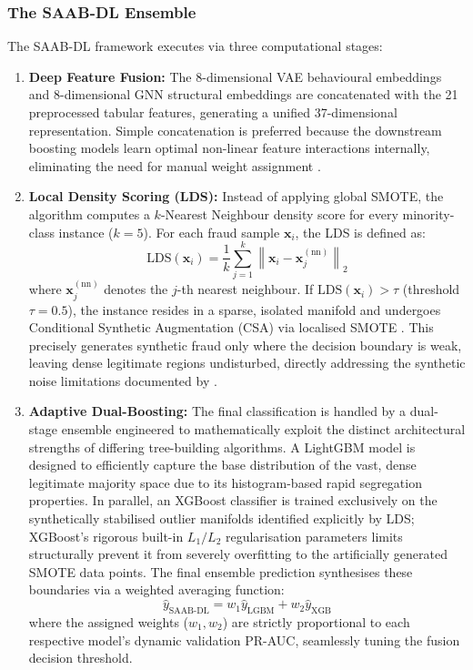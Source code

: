 \documentclass[a4paper,fleqn]{cas-sc}
\begin{document}
\subsubsection{The SAAB-DL Ensemble}
The SAAB-DL framework executes via three computational stages:
\begin{enumerate}
    \item \textbf{Deep Feature Fusion:} The 8-dimensional VAE behavioural embeddings and 8-dimensional GNN structural embeddings are concatenated with the 21 preprocessed tabular features, generating a unified 37-dimensional representation. Simple concatenation is preferred because the downstream boosting models learn optimal non-linear feature interactions internally, eliminating the need for manual weight assignment \cite{kungu2026hybrid}.
    \item \textbf{Local Density Scoring (LDS):} Instead of applying global SMOTE, the algorithm computes a $k$-Nearest Neighbour density score for every minority-class instance ($k=5$). For each fraud sample $\mathbf{x}_i$, the LDS is defined as:
    \begin{equation}
    \text{LDS}(\mathbf{x}_i) = \frac{1}{k}\sum_{j=1}^{k} \left\|\mathbf{x}_i - \mathbf{x}_j^{(\text{nn})}\right\|_2
    \label{eq:lds}
    \end{equation}
    where $\mathbf{x}_j^{(\text{nn})}$ denotes the $j$-th nearest neighbour. If $\text{LDS}(\mathbf{x}_i) > \tau$ (threshold $\tau = 0.5$), the instance resides in a sparse, isolated manifold and undergoes Conditional Synthetic Augmentation (CSA) via localised SMOTE \cite{Chawla2002SMOTE}. This precisely generates synthetic fraud only where the decision boundary is weak, leaving dense legitimate regions undisturbed, directly addressing the synthetic noise limitations documented by \cite{Bonde2025Improving}.
    \item \textbf{Adaptive Dual-Boosting:} The final classification is handled by a dual-stage ensemble engineered to mathematically exploit the distinct architectural strengths of differing tree-building algorithms. A LightGBM model is designed to efficiently capture the base distribution of the vast, dense legitimate majority space due to its histogram-based rapid segregation properties. In parallel, an XGBoost classifier is trained exclusively on the synthetically stabilised outlier manifolds identified explicitly by LDS; XGBoost's rigorous built-in $L_1/L_2$ regularisation parameters limits structurally prevent it from severely overfitting to the artificially generated SMOTE data points. The final ensemble prediction synthesises these boundaries via a weighted averaging function:
    \begin{equation}
    \hat{y}_{\text{SAAB-DL}} = w_1\hat{y}_{\text{LGBM}} + w_2\hat{y}_{\text{XGB}}
    \label{eq:saab_pred}
    \end{equation}
    where the assigned weights ($w_1, w_2$) are strictly proportional to each respective model's dynamic validation PR-AUC, seamlessly tuning the fusion decision threshold.
\end{enumerate}
\end{document}
